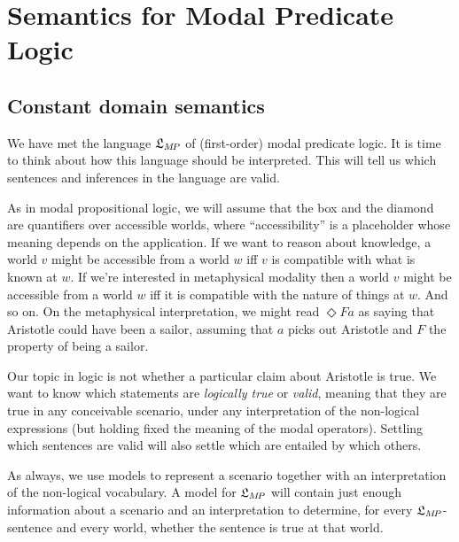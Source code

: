\chapter{Semantics for Modal Predicate Logic}\label{ch:qml2}

\section{Constant domain semantics}\label{sec:constantdomainsemantics}

We have met the language $\mathfrak{L}_{M\!P}$ of (first-order) modal predicate logic. It
is time to think about how this language should be interpreted. This will tell
us which sentences and inferences in the language are valid.

As in modal propositional logic, we will assume that the box and the diamond are
quantifiers over accessible worlds, where ``accessibility'' is a placeholder
whose meaning depends on the application. If we want to reason about knowledge,
a world $v$ might be accessible from a world $w$ iff $v$ is compatible with what
is known at $w$. If we're interested in metaphysical modality then a world $v$
might be accessible from a world $w$ iff it is compatible with the nature of
things at $w$. And so on. On the metaphysical interpretation, we might read
$\Diamond Fa$ as saying that Aristotle could have been a sailor, assuming that
$a$ picks out Aristotle and $F$ the property of being a sailor.

Our topic in logic is not whether a particular claim about Aristotle is true. We
want to know which statements are \emph{logically true} or \emph{valid}, meaning
that they are true in any conceivable scenario, under any interpretation of the
non-logical expressions (but holding fixed the meaning of the modal operators).
Settling which sentences are valid will also settle which are entailed by which
others.

As always, we use models to represent a scenario together with an interpretation
of the non-logical vocabulary. A model for $\mathfrak{L}_{M\!P}$ will contain just enough
information about a scenario and an interpretation to determine, for every
$\mathfrak{L}_{M\!P}$-sentence and every world, whether the sentence is true at that
world.

